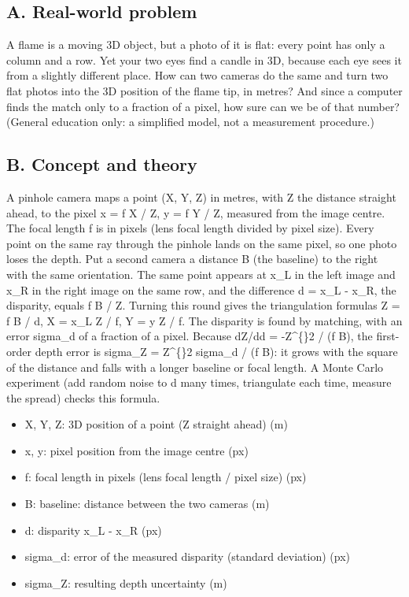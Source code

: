 \documentclass[11pt,a4paper]{article}
\begin{document}
\subsection*{A. Real-world problem}
A flame is a moving 3D object, but a photo of it is flat: every point has only a column and a row. Yet your two eyes find a candle in 3D, because each eye sees it from a slightly different place. How can two cameras do the same and turn two flat photos into the 3D position of the flame tip, in metres? And since a computer finds the match only to a fraction of a pixel, how sure can we be of that number? (General education only: a simplified model, not a measurement procedure.)

\subsection*{B. Concept and theory}
A pinhole camera maps a point (X, Y, Z) in metres, with Z the distance straight ahead, to the pixel x = f X / Z, y = f Y / Z, measured from the image centre. The focal length f is in pixels (lens focal length divided by pixel size). Every point on the same ray through the pinhole lands on the same pixel, so one photo loses the depth. Put a second camera a distance B (the baseline) to the right with the same orientation. The same point appears at x\_L in the left image and x\_R in the right image on the same row, and the difference d = x\_L - x\_R, the disparity, equals f B / Z. Turning this round gives the triangulation formulas Z = f B / d, X = x\_L Z / f, Y = y Z / f. The disparity is found by matching, with an error sigma\_d of a fraction of a pixel. Because dZ/dd = -Z\textasciicircum\{\}2 / (f B), the first-order depth error is sigma\_Z = Z\textasciicircum\{\}2 sigma\_d / (f B): it grows with the square of the distance and falls with a longer baseline or focal length. A Monte Carlo experiment (add random noise to d many times, triangulate each time, measure the spread) checks this formula.

\begin{itemize}[nosep]
\item X, Y, Z: 3D position of a point (Z straight ahead) (m)
\item x, y: pixel position from the image centre (px)
\item f: focal length in pixels (lens focal length / pixel size) (px)
\item B: baseline: distance between the two cameras (m)
\item d: disparity x\_L - x\_R (px)
\item sigma\_d: error of the measured disparity (standard deviation) (px)
\item sigma\_Z: resulting depth uncertainty (m)
\end{itemize}
\end{document}

